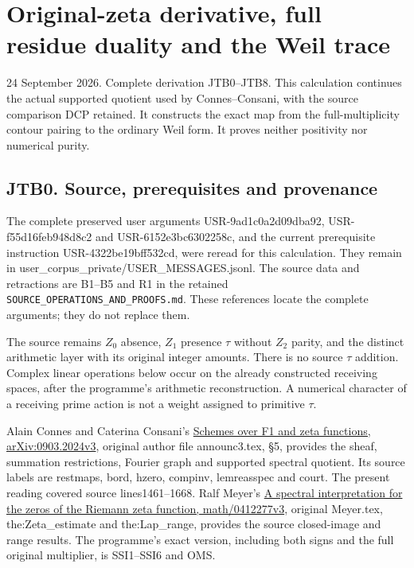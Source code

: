 \section{Original-zeta derivative, full residue duality and the Weil
trace}\label{original-zeta-derivative-full-residue-duality-and-the-weil-trace}

24 September 2026. Complete derivation JTB0--JTB8. This calculation
continues the actual supported quotient used by Connes--Consani, with
the source comparison DCP retained. It constructs the exact map from the
full-multiplicity contour pairing to the ordinary Weil form. It proves
neither positivity nor numerical purity.

\subsection{JTB0. Source, prerequisites and
provenance}\label{jtb0.-source-prerequisites-and-provenance}

The complete preserved user arguments USR-9ad1c0a2d09dba92,
USR-f55d16feb948d8c2 and USR-6152e3bc6302258c, and the current
prerequisite instruction USR-4322be19bff532cd, were reread for this
calculation. They remain in user\_corpus\_private/USER\_MESSAGES.jsonl.
The source data and retractions are B1--B5 and R1 in the retained
\nolinkurl{SOURCE_OPERATIONS_AND_PROOFS.md}. These references locate the complete
arguments; they do not replace them.

The source remains \(Z_0\) absence, \(Z_1\) presence \(\tau\) without
\(Z_2\) parity, and the distinct arithmetic layer with its original
integer amounts. There is no source \(\tau\) addition. Complex linear
operations below occur on the already constructed receiving spaces,
after the programme's arithmetic reconstruction. A numerical character
of a receiving prime action is not a weight assigned to primitive
\(\tau\).

Alain Connes and Caterina Consani's
\href{https://arxiv.org/abs/0903.2024v3}{Schemes over F1 and zeta
functions, arXiv:0903.2024v3}, original author file announc3.tex, §5,
provides the sheaf, summation restrictions, Fourier graph and supported
spectral quotient. Its source labels are restmaps, bord, hzero, compinv,
lemreasspec and court. The present reading covered source
lines1461--1668. Ralf Meyer's
\href{https://arxiv.org/abs/math/0412277v3}{A spectral interpretation
for the zeros of the Riemann zeta function, math/0412277v3}, original
Meyer.tex, the:Zeta\_estimate and the:Lap\_range, provides the source
closed-image and range results. The programme's exact version, including
both signs and the full original multiplier, is SSI1--SSI6 and OMS.

